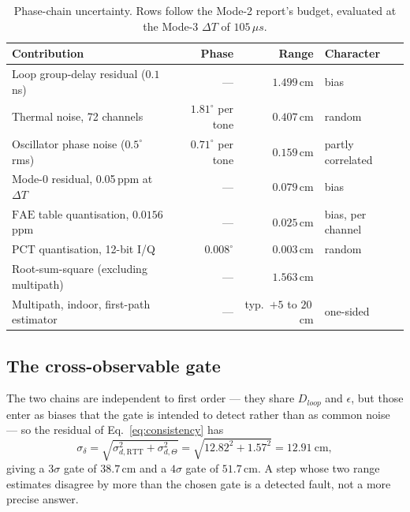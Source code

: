 \documentclass[11pt,a4paper]{article}
\newcommand{\us}{\,\ensuremath{\upmu}s}
\newcommand{\PCT}{\mathrm{PCT}}
\newcommand{\FAE}{\mathrm{FAE}}
\newcommand{\RTT}{\mathrm{RTT}}
\providecommand{\upmu}{\mu}
\begin{document}
\begin{table}[h]
\caption{Phase-chain uncertainty. Rows follow the Mode-2 report's budget, evaluated at the Mode-3
$\Delta T$ of $105\us$.}
\label{tab:example}
\centering\small
\begin{tabular}{@{}L{54mm}rrL{26mm}@{}}
\toprule
Contribution & Phase & Range & Character \\
\midrule
Loop group-delay residual ($0.1$\,ns)  & --- & $1.499$\,cm & bias \\
Thermal noise, 72 channels             & $1.81^{\circ}$ per tone & $0.407$\,cm & random \\
Oscillator phase noise ($0.5^{\circ}$ rms) & $0.71^{\circ}$ per tone & $0.159$\,cm & partly correlated \\
Mode-0 residual, 0.05\,ppm at $\Delta T$ & --- & $0.079$\,cm & bias \\
$\FAE$ table quantisation, $0.0156$\,ppm & --- & $0.025$\,cm & bias, per channel \\
$\PCT$ quantisation, 12-bit I/Q        & $0.008^{\circ}$ & $0.003$\,cm & random \\
\midrule
Root-sum-square (excluding multipath)  & --- & $1.563$\,cm & \\
\midrule
Multipath, indoor, first-path estimator & --- & typ.\ $+5$ to $20$\,cm & one-sided \\
\bottomrule
\end{tabular}
\end{table}

\subsection{The cross-observable gate}

The two chains are independent to first order --- they share $D_{loop}$ and $\epsilon$, but those
enter as biases that the gate is intended to detect rather than as common noise --- so the residual
of Eq.~\eqref{eq:consistency} has
\begin{equation}
\sigma_\delta = \sqrt{\sigma_{d,\RTT}^2 + \sigma_{d,\Theta}^2}
   = \sqrt{12.82^2 + 1.57^2} = 12.91\ \text{cm},
\end{equation}
giving a $3\sigma$ gate of $38.7$\,cm and a $4\sigma$ gate of $51.7$\,cm. A step whose two range
estimates disagree by more than the chosen gate is a detected fault, not a more precise answer.
\end{document}
